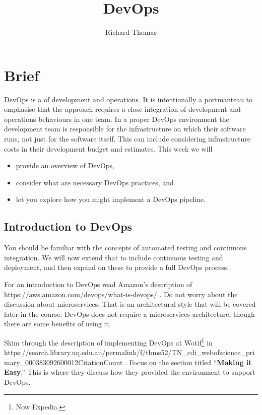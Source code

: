 \documentclass{csse4400}
\title{DevOps}
\author{Richard Thomas}
\date{\week{5}}
\begin{document}
\maketitle

\section{Brief}
DevOps is a  of development and operations.
It is intentionally a portmanteau to emphasise that the approach requires a close integration
of development and operations behaviours in one team.
In a proper DevOps environment the development team is responsible for the infrastructure on which their software runs,
not just for the software itself.
This can include considering infrastructure costs in their development budget and estimates.
This week we will
\begin{itemize}
    \item provide an overview of DevOps,
    \item consider what are necessary DevOps practices, and
    \item let you explore how you might implement a DevOps pipeline.
\end{itemize}


\subsection{Introduction to DevOps}
You should be familiar with the concepts of automated testing and continuous integration.
We will now extend that to include continuous testing and deployment,
and then expand on these to provide a full DevOps process.

For an introduction to DevOps read Amazon's description of 
{https://aws.amazon.com/devops/what-is-devops/} \cite{AWS-DevOps}.
Do not worry about the discussion about microservices.
That is an architectural style that will be covered later in the course.
DevOps does not require a microservices architecture,
though there are some benefits of using it.

Skim through the description of implementing DevOps at Wotif\footnote{Now Expedia.} in
{https://search.library.uq.edu.au/permalink/f/tbms52/TN_cdi_webofscience_primary_000383092600012CitationCount}
\cite{CallananMatt2016DMIE}.
Focus on the section titled ``\textbf{Making it Easy}.''
This is where they discuss how they provided the environment to support DevOps.
\end{document}
